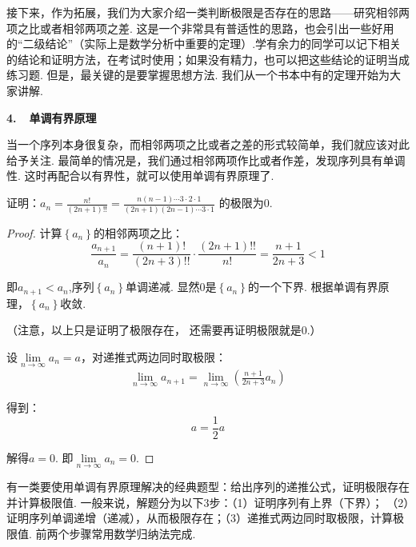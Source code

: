 接下来，作为拓展，我们为大家介绍一类判断极限是否存在的思路——研究相邻两项之比或者相邻两项之差. 这是一个非常具有普适性的思路，也会引出一些好用的“二级结论”（实际上是数学分析中重要的定理）.学有余力的同学可以记下相关的结论和证明方法，在考试时使用；如果没有精力，也可以把这些结论的证明当成练习题. 但是，最关键的是要掌握思想方法. 我们从一个书本中有的定理开始为大家讲解.\vspace{1em}

\textbf{4.~~单调有界原理}\vspace{0.25em}

当一个序列本身很复杂，而相邻两项之比或者之差的形式较简单，我们就应该对此给予关注. 最简单的情况是，我们通过相邻两项作比或者作差，发现序列具有单调性.
这时再配合以有界性，就可以使用单调有界原理了.

\begin{example}
\label{ex:ch01-22}
证明：$a_{n}=\displaystyle\frac{n!}{(2n+1)!!}=\displaystyle\frac{n(n-1)\cdots 3 \cdot 2 \cdot 1}{(2n+1)(2n-1)\cdots 3 \cdot 1}$
的极限为$0$.
\end{example}

\begin{proof}
计算$\left\{ a_{n} \right\}$的相邻两项之比：
$$
\frac{a_{n+1}}{a_{n}} = \frac{(n+1)!}{(2n+3)!!} \cdot \frac{(2n+1)!!}{n!} = \frac{n+1}{2n+3} < 1
$$

即$a_{n+1}<a_{n}$,序列$\left\{ a_{n} \right\}$单调递减. 显然0是$\left\{ a_{n} \right\}$的一个下界. 根据单调有界原理，$\left\{ a_{n} \right\}$收敛.\par
（注意，以上只是证明了极限存在，
还需要再证明极限就是0.）\par

设$\lim\limits_{n \to \infty}a_{n}=a$，对递推式两边同时取极限：
\begin{equation}
    \begin{aligned}
        \lim\limits_{n \to \infty} a_{n+1} = \lim\limits_{n \to \infty}\left( \frac{n+1}{2n+3}a_{n} \right)
        \nonumber
    \end{aligned}
\end{equation}

得到：
$$
a= \frac{1}{2}a
$$

解得$a=0$. 即$\lim\limits_{n \to \infty}a_{n}=0$.
\end{proof}

有一类要使用单调有界原理解决的经典题型：给出序列的递推公式，证明极限存在并计算极限值. 一般来说，解题分为以下3步：（1）证明序列有上界（下界）；
（2）证明序列单调递增（递减），从而极限存在；（3）递推式两边同时取极限，计算极限值. 前两个步骤常用数学归纳法完成.

